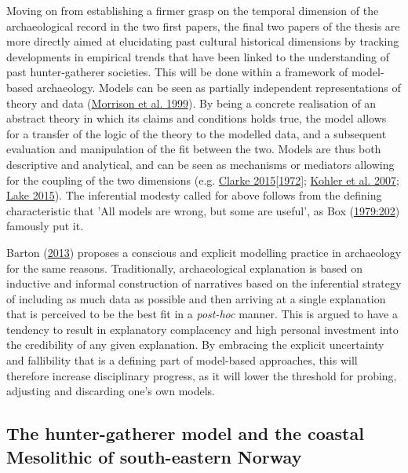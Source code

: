 \documentclass[
  a4paper,
  oneside]{uiophdthesis}
\begin{document}
Moving on from establishing a firmer grasp on the temporal dimension of the archaeological record in the two first papers, the final two papers of the thesis are more directly aimed at elucidating past cultural historical dimensions by tracking developments in empirical trends that have been linked to the understanding of past hunter-gatherer societies. This will be done within a framework of model-based archaeology. Models can be seen as partially independent representations of theory and data (\protect\hyperlink{ref-morrison1999}{Morrison et al. 1999}). By being a concrete realisation of an abstract theory in which its claims and conditions holds true, the model allows for a transfer of the logic of the theory to the modelled data, and a subsequent evaluation and manipulation of the fit between the two. Models are thus both descriptive and analytical, and can be seen as mechanisms or mediators allowing for the coupling of the two dimensions (e.g. \protect\hyperlink{ref-clarke1972}{Clarke 2015{[}1972{]}}; \protect\hyperlink{ref-kohler2007}{Kohler et al. 2007}; \protect\hyperlink{ref-lake2015}{Lake 2015}). The inferential modesty called for above follows from the defining characteristic that 'All models are wrong, but some are useful', as Box (\protect\hyperlink{ref-box1979}{1979:202}) famously put it.

Barton (\protect\hyperlink{ref-barton2013}{2013}) proposes a conscious and explicit modelling practice in archaeology for the same reasons. Traditionally, archaeological explanation is based on inductive and informal construction of narratives based on the inferential strategy of including as much data as possible and then arriving at a single explanation that is perceived to be the best fit in a \emph{post-hoc} manner. This is argued to have a tendency to result in explanatory complacency and high personal investment into the credibility of any given explanation. By embracing the explicit uncertainty and fallibility that is a defining part of model-based approaches, this will therefore increase disciplinary progress, as it will lower the threshold for probing, adjusting and discarding one's own models.

\hypertarget{the-hunter-gatherer-model-and-the-coastal-mesolithic-of-south-eastern-norway}{%
\subsection{The hunter-gatherer model and the coastal Mesolithic of south-eastern Norway}\label{the-hunter-gatherer-model-and-the-coastal-mesolithic-of-south-eastern-norway}}
\end{document}
